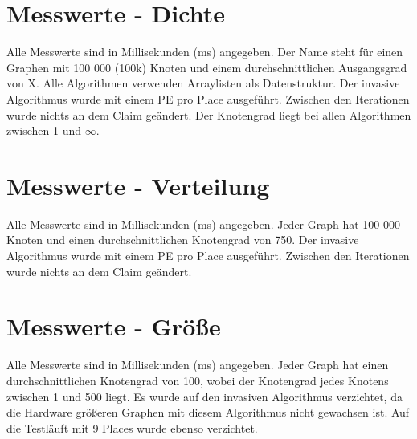 

\appendix
{}

\section{Messwerte - Dichte}
\label{Anhang-Messwerte-Dichte}
Alle Messwerte sind in Millisekunden (ms) angegeben. Der Name  steht für einen Graphen mit 100 000 (100k) Knoten und einem durchschnittlichen Ausgangsgrad von X. Alle Algorithmen verwenden Arraylisten als Datenstruktur. Der invasive Algorithmus wurde mit einem PE pro Place ausgeführt. Zwischen den Iterationen wurde nichts an dem Claim geändert. Der Knotengrad liegt bei allen Algorithmen zwischen 1 und $\infty$.
 

\section{Messwerte - Verteilung}
\label{Anhang-Messwerte-Verteilung}
Alle Messwerte sind in Millisekunden (ms) angegeben. Jeder Graph hat 100 000 Knoten und einen durchschnittlichen Knotengrad von 750. Der invasive Algorithmus wurde mit einem PE pro Place ausgeführt. Zwischen den Iterationen wurde nichts an dem Claim geändert.


\section{Messwerte - Größe}
\label{Anhang-Messwerte-Groesse}
Alle Messwerte sind in Millisekunden (ms) angegeben. Jeder Graph hat einen durchschnittlichen Knotengrad von 100, wobei der Knotengrad jedes Knotens zwischen 1 und 500 liegt. Es wurde auf den invasiven Algorithmus verzichtet, da die Hardware größeren Graphen mit diesem Algorithmus nicht gewachsen ist. Auf die Testläuft mit 9 Places wurde ebenso verzichtet.


		
